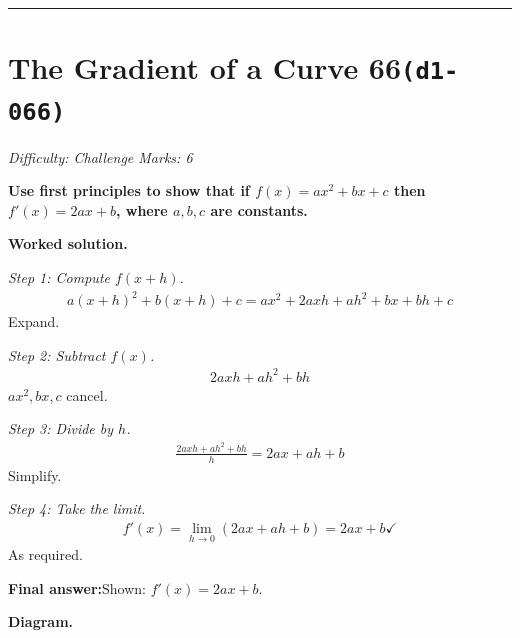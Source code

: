 \documentclass[11pt]{article}
\newcommand{\question}[1]{\par\medskip\noindent\textbf{#1}\par}
\begin{document}
\medskip\hrule

\section*{The Gradient of a Curve 66\quad\small\texttt{(d1-066)}}
\textit{Difficulty: Challenge \quad\textbar\quad Marks: 6}

\question{Use first principles to show that if \( f(x) = ax^2 + bx + c \) then \( f'(x) = 2ax + b \), where \( a, b, c \) are constants.}

\textbf{Worked solution.}

\textit{Step 1: Compute \( f(x+h) \).}
\[\begin{gathered}
a(x+h)^2 + b(x+h) + c = ax^2 + 2axh + ah^2 + bx + bh + c
\end{gathered}\]
Expand.

\textit{Step 2: Subtract \( f(x) \).}
\[\begin{gathered}
2axh + ah^2 + bh
\end{gathered}\]
\( ax^2, bx, c \) cancel.

\textit{Step 3: Divide by \( h \).}
\[\begin{gathered}
\frac{2axh + ah^2 + bh}{h} = 2ax + ah + b
\end{gathered}\]
Simplify.

\textit{Step 4: Take the limit.}
\[\begin{gathered}
f'(x) = \lim_{h \to 0}(2ax + ah + b) = 2ax + b \checkmark
\end{gathered}\]
As required.

\begin{answerbox}
\textbf{Final answer:}\quad Shown: \(\displaystyle  f'(x) = 2ax + b \).
\end{answerbox}
\textbf{Diagram.}
\end{document}

